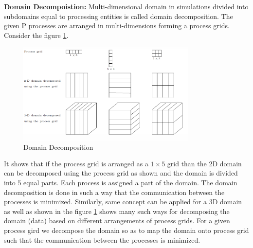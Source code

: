 \documentclass[12pt]{article}
\begin{document}
\textbf{Domain Decompoistion: }Multi-dimensional domain in simulations divided into subdomains equal to processing entities is called domain decomposition.
The given P processes are arranged in multi-dimensions forming a process grids. Consider the figure \ref{fig:domain}.
\begin{figure}[H]
    \centering
    \includegraphics[width=0.8\textwidth]{images/domain.png}
    \caption{Domain Decomposition}
    \label{fig:domain}
\end{figure}
It shows that if the process grid is arranged as a $1 \times 5$ grid than the 2D domain can be decomposed using the process grid as shown 
and the domain is divided into 5 equal parts. Each process is assigned a part of the domain. The domain decomposition is done in such a way that the communication between the processes is minimized.
Similarly, same concept can be applied for a 3D domain as well as shown in the figure \ref{fig:domain} shows many such ways for decomposing the domain (data) based on different arrangements of process grids.
For a given process gird we decompose the domain so as to map the domain onto process grid such that the communication between the processes is minimized.
\end{document}
